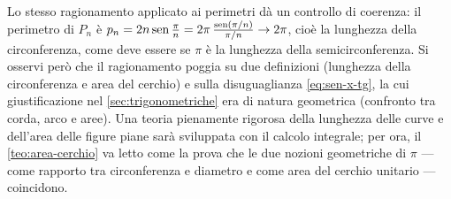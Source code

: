 \begin{osservazione}
Lo stesso ragionamento applicato ai perimetri dà un controllo di coerenza: il perimetro
di $P_{n}$ è $p_{n}=2n\operatorname{sen}\frac\pi n=2\pi\,\frac{\operatorname{sen}(\pi/n)}{\pi/n}\to2\pi$, cioè la
lunghezza della circonferenza, come deve essere se $\pi$ è la lunghezza della
semicirconferenza. Si osservi però che il ragionamento poggia su due definizioni
(lunghezza della circonferenza e area del cerchio) e sulla disuguaglianza
\eqref{eq:sen-x-tg}, la cui giustificazione nel \cref{sec:trigonometriche} era di natura
geometrica (confronto tra corda, arco e aree). Una teoria pienamente rigorosa della
lunghezza delle curve e dell'area delle figure piane sarà sviluppata con il calcolo
integrale; per ora, il \cref{teo:area-cerchio} va letto come la prova che le due
nozioni geometriche di $\pi$ --- come rapporto tra circonferenza e diametro e come area
del cerchio unitario --- coincidono.
\end{osservazione}
